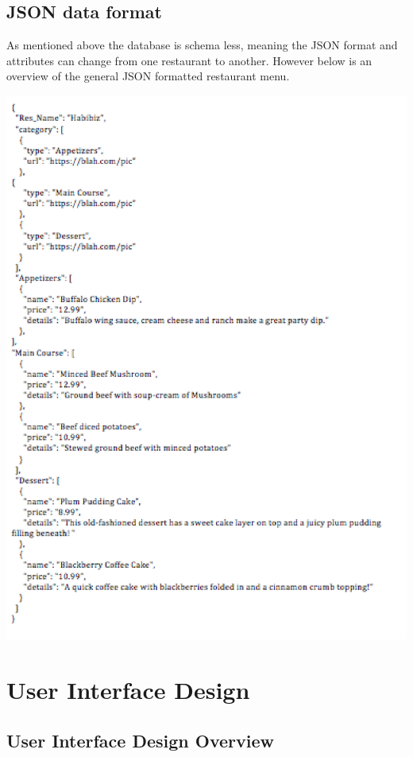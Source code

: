\documentclass[12pt, titlepage]{article}
\begin{document}
\subsection{JSON data format}
As mentioned above the database is schema less, meaning the JSON format and attributes can change from one restaurant to another. However below is an overview of the general JSON formatted restaurant menu.

\includegraphics[width=150mm,scale=0.5]{JSONdata.png}


\section{User Interface Design}

\subsection{User Interface Design Overview}
\end{document}
